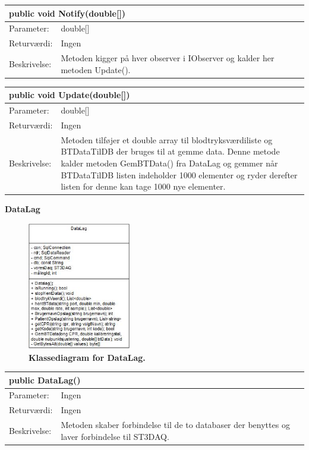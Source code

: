 \begin{table}[H]
\label{tab:tabel2}
\begin{tabular}{| l | p{13cm} |}
   \hline
   \multicolumn{2}{|l|}{public void Notify(double[])} \\ \hline
   Parameter: & double[] \\ \hline
   Returværdi: & Ingen\\ \hline
   Beskrivelse: & Metoden kigger på hver observer i IObserver og kalder her metoden Update().\\ \hline
\end{tabular}
\end{table}
\begin{table}[H]
\label{tab:tabel2}
\begin{tabular}{| l | p{13cm} |}
   \hline
   \multicolumn{2}{|l|}{public void Update(double[])} \\ \hline
   Parameter: & double[] \\ \hline
   Returværdi: & Ingen\\ \hline
   Beskrivelse: & Metoden tilføjer et double array til blodtryksværdiliste og BTDataTilDB der bruges til at gemme data. Denne metode kalder metoden GemBTData() fra DataLag og gemmer når BTDataTilDB listen indeholder 1000 elementer og ryder derefter listen for denne kan tage 1000 nye elementer. \\ \hline
\end{tabular}
\end{table}
\textbf{DataLag}
\begin{figure}[H]
\includegraphics[width =0.4\textwidth , center]{billeder/klassediagramdata}
\caption{\textbf{Klassediagram for DataLag.}}
\end{figure}
\begin{table}[H]
\label{tab:tabel2}
\begin{tabular}{| l | p{13cm} |}
   \hline
   \multicolumn{2}{|l|}{public DataLag()} \\ \hline
   Parameter: & Ingen\\ \hline
   Returværdi: & Ingen\\ \hline
   Beskrivelse: & Metoden skaber forbindelse til de to databaser der benyttes og laver forbindelse til ST3DAQ.\\ \hline
\end{tabular}
\end{table}
